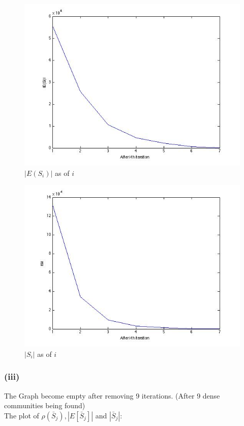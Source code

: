 \documentclass{article}
\begin{document}
\begin{figure}[H]
\centering
\includegraphics[scale=0.5]{q4-ESi.jpg}
\caption{ $|E(S_i)|$ as of $i$ }
\label{}
\end{figure}


\begin{figure}[H]
\centering
\includegraphics[scale=0.5]{q4-Si.jpg}
\caption{ $|S_i|$ as of $i$ }
\label{}
\end{figure}

\subsubsection{(iii)}
The Graph become empty after removing 9 iterations. (After 9 dense communities being found) \\
The plot of $\rho(\bar S_j), |E[\bar S_j]|$ and $|\bar S_j|$: \\
\end{document}
